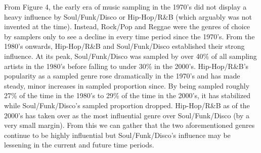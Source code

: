 \documentclass[pageno]{jpaper}
\begin{document}
From Figure 4, the early era of music sampling in the 1970's did not display a heavy influence by Soul/Funk/Disco or Hip-Hop/R\&B (which arguably was not invented at the time). Instead, Rock/Pop and Reggae were the genres of choice by samplers only to see a decline in every time period since the 1970's. From the 1980's onwards, Hip-Hop/R\&B and Soul/Funk/Disco established their strong influence. At its peak, Soul/Funk/Disco was sampled by over 40\% of all sampling artists in the 1980's before falling to under 30\% in the 2000's. Hip-Hop/R\&B's popularity as a sampled genre rose dramatically in the 1970's and has made steady, minor increases in sampled proportion since. By being sampled roughly 27\% of the time in the 1980's to 29\% of the time in the 2000's, it has stabilized while Soul/Funk/Disco's sampled proportion dropped. Hip-Hop/R\&B as of the 2000's has taken over as the most influential genre over Soul/Funk/Disco (by a very small margin). From this we can gather that the two aforementioned genres continue to be highly influential but Soul/Funk/Disco's influence may be lessening in the current and future time periods.
\end{document}
